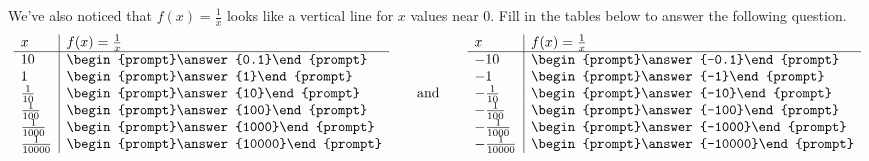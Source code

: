 \documentclass{ximera}
\begin{document}
\begin{problem}
We've also noticed that $f(x) = \frac{1}{x}$ looks like a vertical line for $x$ values near $0$.  Fill in the tables below to answer the following question. 
  \[
  \begin{array}{l|l}
    x      & f(x) = \frac{1}{x}     \\ \hline
    10    & \begin{prompt}\answer{0.1}\end{prompt}\\
    1  & \begin{prompt}\answer{1}\end{prompt}\\
    \frac{1}{10}  & \begin{prompt}\answer{10}\end{prompt}\\
    \frac{1}{100} & \begin{prompt}\answer{100}\end{prompt} \\
    \frac{1}{1000} & \begin{prompt}\answer{1000}\end{prompt} \\
    \frac{1}{10000} & \begin{prompt}\answer{10000}\end{prompt} \\
  \end{array}
  \qquad\text{and}\qquad
  \begin{array}{l|l}
    x      & f(x) = \frac{1}{x}     \\ \hline
    -10    & \begin{prompt}\answer{-0.1}\end{prompt}\\
    -1  & \begin{prompt}\answer{-1}\end{prompt}\\
    -\frac{1}{10}  & \begin{prompt}\answer{-10}\end{prompt}\\
    -\frac{1}{100} & \begin{prompt}\answer{-100}\end{prompt} \\
    -\frac{1}{1000} & \begin{prompt}\answer{-1000}\end{prompt} \\
    -\frac{1}{10000} & \begin{prompt}\answer{-10000}\end{prompt} \\
  \end{array}
  \]
  

\end{problem}
\end{document}
